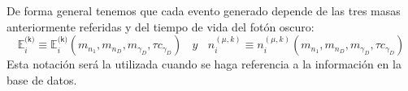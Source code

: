 

De forma general tenemos que cada evento generado depende de las tres masas anteriormente referidas y del tiempo de vida del fotón oscuro:
\begin{equation}\label{notaEvent2}
\mathbb{E}_i^\textsf{(k)} \equiv \mathbb{E}_i^\textsf{(k)}
(m_{n_1}, m_{n_D}, m_{\gamma_D}, \tau c_{\gamma_D}) ~~~~ y ~~~~ n_i^{(\mu,k)} \equiv n_i^{(\mu,k)}
(m_{n_1}, m_{n_D}, m_{\gamma_D}, \tau c_{\gamma_D})
\end{equation}
Esta notación será la utilizada cuando se haga referencia a la información en la base de datos.




















